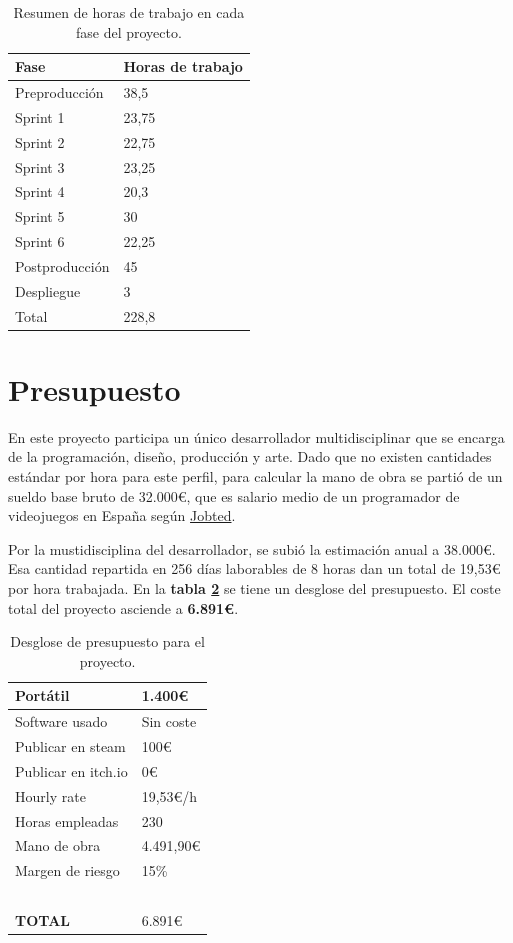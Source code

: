 \begin{table}[hbt]
    \centering
    \begin{tabular}{|l|l|}
    \hline
        Fase & Horas de trabajo \\ \hline
        Preproducción & 38,5 \\ \hline
        Sprint 1 & 23,75 \\ \hline
        Sprint 2 & 22,75 \\ \hline
        Sprint 3 & 23,25 \\ \hline
        Sprint 4 & 20,3 \\ \hline
        Sprint 5 & 30 \\ \hline
        Sprint 6 & 22,25 \\ \hline
        Postproducción & 45 \\ \hline
        Despliegue & 3 \\ \hline
        Total & 228,8 \\ \hline
    \end{tabular}
    \label{tab:hours}
\caption{Resumen de horas de trabajo en cada fase del proyecto.}
\end{table}


\section{Presupuesto}


En este proyecto participa un único desarrollador multidisciplinar que se encarga de la programación, diseño, producción y arte. Dado que no existen cantidades estándar por hora para este perfil, para calcular la mano de obra se partió de un sueldo base bruto de 32.000€, que es salario medio de un programador de videojuegos en España según \href{https://www.jobted.es/salario/programador-videojuegos}{Jobted}. 

Por la mustidisciplina del desarrollador, se subió la estimación anual a 38.000€. Esa cantidad repartida en 256 días laborables de 8 horas dan un total de 19,53€ por hora trabajada. En la \textbf{tabla \ref{tab:budget}} se tiene un desglose del presupuesto. El coste total del proyecto asciende a \textbf{6.891€}.

\begin{table}[!ht]
    \centering
    \begin{tabular}{|l|l|}
    \hline
        Portátil & 1.400€ \\ \hline
        Software usado & Sin coste \\ \hline
        Publicar en steam & 100€ \\ \hline
        Publicar en itch.io & 0€ \\ \hline
        Hourly rate & 19,53€/h \\ \hline
        Horas empleadas & 230 \\ \hline
        Mano de obra & 4.491,90€ \\ \hline
        Margen de riesgo & 15\% \\ \hline
        ~ & ~ \\ \hline
        \textbf{TOTAL} & 6.891€ \\ \hline
    \end{tabular}
    \caption{Desglose de presupuesto para el proyecto.}
    \label{tab:budget}
\end{table}
